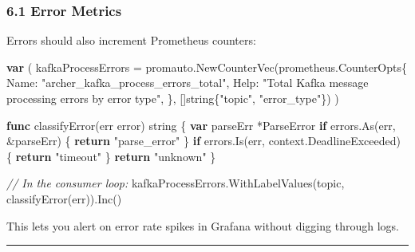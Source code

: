 \documentclass[
]{article}
\newenvironment{Shaded}{}{}
\newcommand{\CommentTok}[1]{\textcolor[rgb]{0.38,0.63,0.69}{\textit{#1}}}
\newcommand{\ControlFlowTok}[1]{\textcolor[rgb]{0.00,0.44,0.13}{\textbf{#1}}}
\newcommand{\DataTypeTok}[1]{\textcolor[rgb]{0.56,0.13,0.00}{#1}}
\newcommand{\KeywordTok}[1]{\textcolor[rgb]{0.00,0.44,0.13}{\textbf{#1}}}
\newcommand{\NormalTok}[1]{#1}
\newcommand{\OperatorTok}[1]{\textcolor[rgb]{0.40,0.40,0.40}{#1}}
\newcommand{\StringTok}[1]{\textcolor[rgb]{0.25,0.44,0.63}{#1}}
\begin{document}
\hypertarget{error-metrics}{%
\subsubsection{6.1 Error Metrics}\label{error-metrics}}

Errors should also increment Prometheus counters:

\begin{Shaded}
\begin{Highlighting}[]
\KeywordTok{var} \OperatorTok{(}
\NormalTok{    kafkaProcessErrors }\OperatorTok{=}\NormalTok{ promauto}\OperatorTok{.}\NormalTok{NewCounterVec}\OperatorTok{(}\NormalTok{prometheus}\OperatorTok{.}\NormalTok{CounterOpts}\OperatorTok{\{}
\NormalTok{        Name}\OperatorTok{:} \StringTok{"archer\_kafka\_process\_errors\_total"}\OperatorTok{,}
\NormalTok{        Help}\OperatorTok{:} \StringTok{"Total Kafka message processing errors by error type"}\OperatorTok{,}
    \OperatorTok{\},} \OperatorTok{[]}\DataTypeTok{string}\OperatorTok{\{}\StringTok{"topic"}\OperatorTok{,} \StringTok{"error\_type"}\OperatorTok{\})}
\OperatorTok{)}

\KeywordTok{func}\NormalTok{ classifyError}\OperatorTok{(}\NormalTok{err }\DataTypeTok{error}\OperatorTok{)} \DataTypeTok{string} \OperatorTok{\{}
    \KeywordTok{var}\NormalTok{ parseErr }\OperatorTok{*}\NormalTok{ParseError}
    \ControlFlowTok{if}\NormalTok{ errors}\OperatorTok{.}\NormalTok{As}\OperatorTok{(}\NormalTok{err}\OperatorTok{,} \OperatorTok{\&}\NormalTok{parseErr}\OperatorTok{)} \OperatorTok{\{}
        \ControlFlowTok{return} \StringTok{"parse\_error"}
    \OperatorTok{\}}
    \ControlFlowTok{if}\NormalTok{ errors}\OperatorTok{.}\NormalTok{Is}\OperatorTok{(}\NormalTok{err}\OperatorTok{,}\NormalTok{ context}\OperatorTok{.}\NormalTok{DeadlineExceeded}\OperatorTok{)} \OperatorTok{\{}
        \ControlFlowTok{return} \StringTok{"timeout"}
    \OperatorTok{\}}
    \ControlFlowTok{return} \StringTok{"unknown"}
\OperatorTok{\}}

\CommentTok{// In the consumer loop:}
\NormalTok{kafkaProcessErrors}\OperatorTok{.}\NormalTok{WithLabelValues}\OperatorTok{(}\NormalTok{topic}\OperatorTok{,}\NormalTok{ classifyError}\OperatorTok{(}\NormalTok{err}\OperatorTok{)).}\NormalTok{Inc}\OperatorTok{()}
\end{Highlighting}
\end{Shaded}

This lets you alert on error rate spikes in Grafana without digging
through logs.

\begin{center}\rule{0.5\linewidth}{0.5pt}\end{center}
\end{document}
